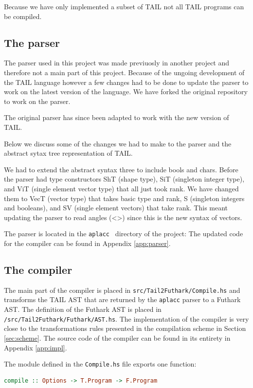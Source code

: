 \documentclass[11pt]{article}
\begin{document}
Because we have only implemented a subset of TAIL not all TAIL programs can be compiled. 

\subsection{The parser}
\label{sec:parser}
The parser used in this project was made previuosly in another project \cite{APLACC} and therefore not a main part of this project.
Because of the ungoing development of the TAIL language however a few changes had to be done to update the parser to work on the latest version of the language. 
We have forked the original repository to work on the parser.

The original parser has since been adapted to work with the new version of TAIL.

Below we discuss some of the changes we had to make to the parser and the abstract sytax tree representation of TAIL.

We had to extend the abstract syntax three to include bools and chars. 
Before the parser had type constructors ShT (shape type), SiT (singleton integer type), and ViT (single element vector type) that all just took rank.
We have changed them to VecT (vector type) that takes basic type and rank, S (singleton integers and booleans), and SV (single element vectors) that take rank.
This meant updating the parser to read angles (<>) since this is the new syntax of vectors.

The parser is located in the {\tt aplacc } directory of the project: 
The updated code for the compiler can be found in Appendix \ref{app:parser}.

\subsection{The compiler}
The main part of the compiler is placed in {\tt src/Tail2Futhark/Compile.hs} and transforms the TAIL AST that are returned by the {\tt aplacc} parser to a Futhark AST. The definition of the Futhark AST is placed in {\tt /src/Tail2Futhark/Futhark/AST.hs}.
The implementation of the compiler is very close to the transformations rules presented in the compilation scheme in Section \ref{sec:scheme}. The source code of the compiler can be found in its entirety in Appendix \ref{app:impl}.

The module defined in the {\tt Compile.hs} file exports one function:
\begin{lstlisting}[language=haskell]
compile :: Options -> T.Program -> F.Program
\end{lstlisting}
\end{document}
